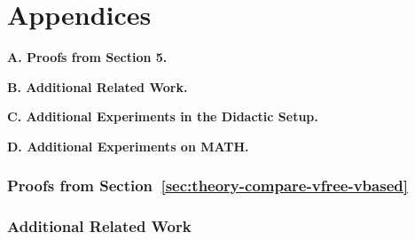 \part*{Appendices}













\textbf{A. Proofs from Section 5.}

\textbf{B. Additional Related Work.}

\textbf{C. Additional Experiments in the Didactic Setup.}

\textbf{D. Additional Experiments on MATH.}


\section{Proofs from Section~\ref{sec:theory-compare-vfree-vbased}}
\label{sec:proofs}


















\section{Additional Related Work}
\label{sec:additional-rel-work}



